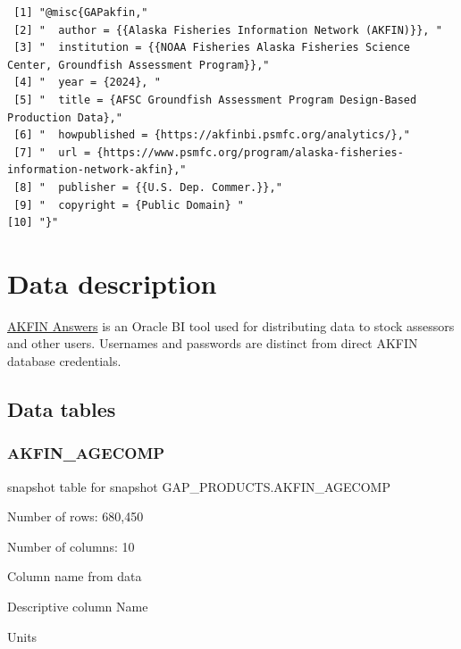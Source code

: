 \documentclass[
  letterpaper,
  oneside,
  open=any]{scrbook}
\begin{document}
\begin{verbatim}
 [1] "@misc{GAPakfin,"                                                                                   
 [2] "  author = {{Alaska Fisheries Information Network (AKFIN)}}, "                                     
 [3] "  institution = {{NOAA Fisheries Alaska Fisheries Science Center, Groundfish Assessment Program}},"
 [4] "  year = {2024}, "                                                                                 
 [5] "  title = {AFSC Groundfish Assessment Program Design-Based Production Data},"                      
 [6] "  howpublished = {https://akfinbi.psmfc.org/analytics/},"                                          
 [7] "  url = {https://www.psmfc.org/program/alaska-fisheries-information-network-akfin},"               
 [8] "  publisher = {{U.S. Dep. Commer.}},"                                                              
 [9] "  copyright = {Public Domain} "                                                                    
[10] "}"                                                                                                 
\end{verbatim}

\chapter{Data description}\label{data-description-2}

\href{https://akfin.psmfc.org/akfin-answers/}{AKFIN Answers} is an
Oracle BI tool used for distributing data to stock assessors and other
users. Usernames and passwords are distinct from direct AKFIN database
credentials.

\section{Data tables}\label{data-tables-1}

\subsection{AKFIN\_AGECOMP}\label{akfin_agecomp}

snapshot table for snapshot GAP\_PRODUCTS.AKFIN\_AGECOMP

Number of rows: 680,450

Number of columns: 10

Column name from data

Descriptive column Name

Units
\end{document}
